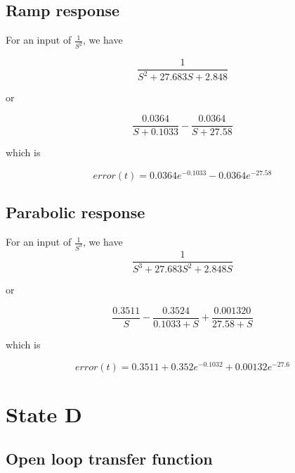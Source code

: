 \subsection{Ramp response}

For an input of $\frac{1}{S^2}$, we have 

\begin{equation}
\frac{1}{S^2 + 27.683 S + 2.848}
\end{equation}

or 

\begin{equation}
\frac{0.0364}{S+0.1033} -\frac{0.0364}{S+27.58}
\end{equation}

which is 

\begin{equation}
error(t) =  0.0364e^{-0.1033} - 0.0364e^{-27.58}
\end{equation}


\subsection{Parabolic response}

For an input of $\frac{1}{S^3}$, we have 
\begin{equation}
\frac{1}{S^3 +27.683 S^2 + 2.848 S}
\end{equation}


or 

\begin{equation}
\frac{0.3511}{S}-\frac{0.3524}{0.1033+S}
+\frac{0.001320}{27.58+S}
\end{equation}

which is

\begin{equation}
error(t) = 0.3511 + 0.352 e^{-0.1032} + 0.00132 e^{-27.6}
\end{equation}

\section{State D}




\subsection{Open loop transfer function}
\begin{comment}
(18, 1)
(1, array([ 0.        ,  0.01131368,  0.00022784]))
(18, 1)
(2, array([ 55.06692161,   4.63278117,   0.77306969]))
\end{comment}

